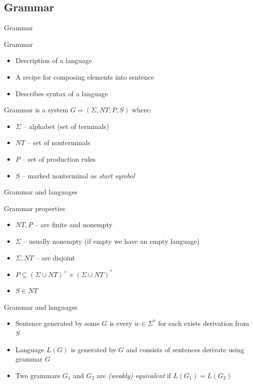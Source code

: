 \documentclass{beamer}
\begin{document}
\subsection{Grammar}

\begin{frame}{Grammar}

\begin{block}{Grammar}
\begin{itemize}
\item Description of a language
\item A recipe for composing elements into sentence
\item Describes syntax of a language
\end{itemize}
\end{block}

\begin{definition}{Grammar}
is a system $G = (\Sigma, NT, P, S)$ where:
\begin{itemize}
\item $\Sigma$ -- alphabet (set of terminals)
\item $NT$ -- set of nonterminals
\item $P$ -- set of production rules
\item $S$ -- marked nonterminal as \textit{start symbol}
\end{itemize}
\end{definition}

\end{frame}

\begin{frame}{Grammar and languages}

\begin{block}{Grammar properties}
\begin{itemize}
\item $NT, P$ -- are finite and nonempty
\item $\Sigma$ -- usually nonempty (if empty we have an empty language)
\item $\Sigma, NT$ -- are disjoint
\item $P \subseteq (\Sigma \cup NT)^{+} \times (\Sigma \cup NT)^{\ast}$
\item $S \in NT$
\end{itemize}
\end{block}

\begin{block}{Grammar and languages}
\begin{itemize}
	\item Sentence generated by some $G$ is every $w\in \Sigma^{\ast}$ for each exists derivation from $S$
	\item Language $L(G)$ is generated by $G$ and consists of sentences derivate using grammar $G$
	\item Two grammars $G_1$ and $G_2$ are \textit{(weakly) equivalent} if $L(G_1) = L(G_2)$
\end{itemize}
\end{block}

 \end{frame}
\end{document}
